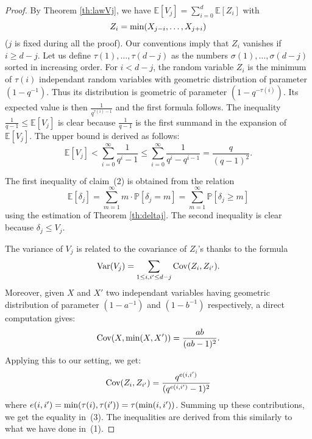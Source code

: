 \documentclass{jT}
\numberwithin{equation}{section}
\theoremstyle{definition}
\renewcommand{\min}{\text{\rm min}}
\renewcommand{\P}{\mathbb P}
\newcommand{\E}{\mathbb E}
\newcommand{\Var}{\text{\rm Var}}
\newcommand{\Cov}{\text{\rm Cov}}
\begin{document}
\begin{proof}
By Theorem \ref{th:lawVj}, we have $\E[V_j] =
\sum_{i=0}^d \E[Z_i]$ with 
$$Z_i = \min(X_{j-i}, \ldots, X_{j+i})$$ 
($j$ 
is fixed during all the proof). Our conventions imply that $Z_i$ 
vanishes if $i \geq d-j$. Let us define 
$\tau(1), \ldots, \tau(d-j)$ as the numbers $\sigma(1), \ldots, 
\sigma(d-j)$ sorted in increasing order. For $i < d-j$, the random variable $Z_i$ 
is the minimum of $\tau(i)$ independant random variables with 
geometric distribution of parameter $(1 - q^{-1})$. Thus its 
distribution is geometric of parameter $(1 - q^{-\tau(i)})$.
Its expected value is then $\frac 1 {q^{\tau(i) - 1}}$ and the first
formula follows. The inequality $\frac 1 {q-1} \leq \E[V_j]$ is clear
because $\frac 1 {q-1}$ is the first summand in the expansion of
$\E[V_j]$. The upper bound is derived as follows:
$$\E[V_j] < \sum_{i=0}^\infty \frac 1{q^i - 1}
\leq \sum_{i=0}^\infty \frac 1{q^i - q^{i-1}} = \frac q {(q-1)^2}.$$

The first inequality of claim~(2) is obtained from the relation 
$$\E[\delta_j] 
= \sum_{m=1}^\infty m \cdot \P[\delta_j = m]
= \sum_{m=1}^\infty \P[\delta_j \geq m]$$ 
using the estimation of Theorem \ref{th:deltaj}. The second inequality 
is clear because $\delta_j \leq V_j$.

The variance of $V_j$ is related to the covariance of $Z_i$'s thanks to 
the formula
$$\Var(V_j) = \sum_{1 \leq i,i' \leq d-j} \Cov(Z_i, Z_{i'}).$$
Moreover, given $X$ and $X'$ two independant variables having geometric
distribution of parameter $(1 - a^{-1})$ and $(1 - b^{-1})$ respectively,
a direct computation gives:
$$\Cov(X, \min(X,X')) = \frac{ab}{(ab-1)^2}.$$
Applying this to our setting, we get:
$$\Cov(Z_i, Z_{i'}) = \frac{q^{e(i,i')}}{(q^{e(i,i')}-1)^2}$$
where $e(i,i') = \min(\tau(i), \tau(i')) = \tau(\min(i,i'))$. Summing
up these contributions, we get the equality in~(3). The inequalities
are derived from this similarly to what we have done in~(1).


\end{proof}
\end{document}

